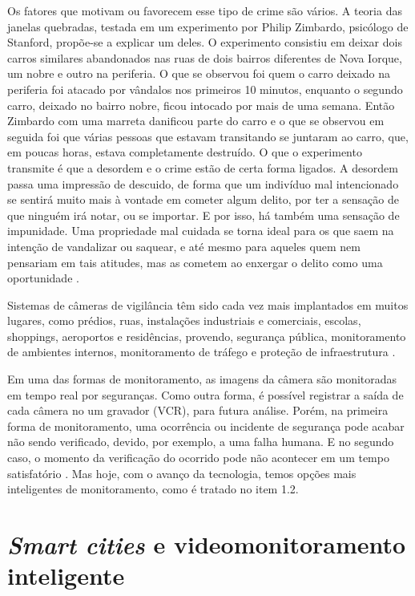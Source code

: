 Os fatores que motivam ou favorecem esse tipo de crime são vários. A teoria das janelas quebradas, testada em um experimento por Philip Zimbardo, psicólogo de Stanford, propõe-se a explicar um deles. O experimento consistiu em deixar dois carros similares abandonados nas ruas de dois bairros diferentes de Nova Iorque, um nobre e outro na periferia. O que se observou foi quem o carro deixado na periferia foi atacado por vândalos nos primeiros 10 minutos, enquanto o segundo carro, deixado no bairro nobre, ficou intocado por mais de uma semana. Então Zimbardo com uma marreta danificou parte do carro e o que se observou em seguida foi que várias pessoas que estavam transitando se juntaram ao carro, que, em poucas horas, estava completamente destruído.  O que o experimento transmite é que a desordem e o crime estão de certa forma ligados. A desordem passa uma impressão de descuido, de forma que um indivíduo mal intencionado se sentirá muito mais à vontade em cometer algum delito, por ter a sensação de que ninguém irá notar, ou se importar. E por isso, há também uma sensação de impunidade. Uma propriedade mal cuidada se torna ideal para os que saem na intenção de vandalizar ou saquear, e até mesmo para aqueles quem nem pensariam em tais atitudes, mas as cometem ao enxergar o delito como uma oportunidade \cite{Wilson1982}.

Sistemas de câmeras de vigilância têm sido cada vez mais implantados em muitos lugares, como prédios, ruas, instalações industriais e comerciais, escolas, shoppings, aeroportos e residências, provendo, segurança pública, monitoramento de ambientes internos, monitoramento de tráfego e proteção de infraestrutura \cite{Puvvadi2015}.

Em uma das formas de monitoramento, as imagens da câmera são monitoradas em tempo real por seguranças. Como outra forma, é possível registrar a saída de cada câmera no um gravador (VCR), para futura análise. Porém, na primeira forma de monitoramento, uma ocorrência ou incidente de segurança pode acabar não sendo verificado, devido, por exemplo, a uma falha humana. E no segundo caso, o momento da verificação do ocorrido pode não acontecer em um tempo satisfatório \cite{Olson2006, RamosLima2019}. Mas hoje, com o avanço da tecnologia, temos opções mais inteligentes de monitoramento, como é tratado no item 1.2.

\section{\textit{Smart cities} e videomonitoramento inteligente}


